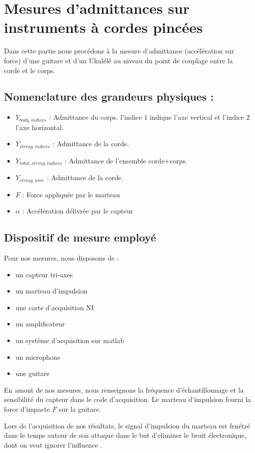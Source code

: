 \chapter{Mesures d'admittances sur instruments à cordes pincées}
Dans cette partie nous procédons à la mesure d'admittance (accélération sur force) d'une guitare et d'un Ukulélé au niveau du point de couplage entre la corde et le corps.
\section{Nomenclature des grandeurs physiques :} 
\begin{itemize}
\item $Y_{body,indices}$ : Admittance du corps. l'indice $1$ indique l'axe vertical et l'indice $2$ l'axe horizontal.
\item $Y_{string,indices}$ : Admittance de la corde.
\item $Y_{total,string,indices}$ : Admittance de l'ensemble corde+corps.
\item $Y_{string,wire}$ : Admittance de la corde.
\item $F$ : Force appliquée par le marteau 
\item $\alpha$ : Accélération délivrée par le capteur 
\end{itemize}

\section{Dispositif de mesure employé}
Pour nos mesures, nous disposons de :
\begin{itemize}
\item un capteur tri-axes
\item un marteau d'impulsion
\item une carte d'acquisition NI
\item un amplificateur
\item un système d'acquisition sur matlab
\item un microphone
\item une guitare
\end{itemize}
En amont de nos mesures, nous renseignons la fréquence d'échantillonnage et la sensibilité du capteur dans le code d'acquisition. Le marteau d'impulsion fourni la force d'impacte $F$ sur la guitare. 

Lors de l'acquisition de nos résultats, le signal d'impulsion du marteau est fenétré dans le temps autour de son attaque dans le but d'eliminer le bruit électronique, dont on veut ignorer l'influence . 

